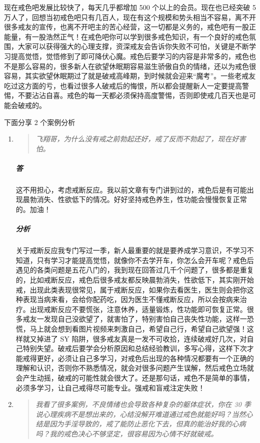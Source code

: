 \documentclass{ctexart}
\begin{document}
现在戒色吧发展比较快了，每天几乎都增加 500 个以上的会员。现在也已经突破 5 万人了，回想当初戒色吧只有几百人，现在有这个规模和势头相当不容易，离不开很多戒友的宣传，也离不开吧主的苦心经营，这一切都是义务的，戒色吧有一股正能量，有一股浩然正气！在戒色吧你可以学到很多戒色知识，有一个良好的戒色氛围，大家可以获得强大的心理支撑，资深戒友会告诉你失败不可怕，关键是不断学习提高觉悟，觉悟修到了即可降伏心魔。戒色后要学习的内容是非常多的，戒色也不是那么容易的，很多新人在欲望休眠期容易滋生骄傲自负的情绪，还以为戒色很容易，其实欲望休眠期过了就是破戒高峰期，到时候就会迎来“魔考”。一些老戒友吃过这方面的亏，也看过很多人破戒后的悔恨，所以都会提醒新人一定要提高警惕，不要沾沾自喜。戒色的每一天都必须保持高度警惕，否则即使戒几百天也是可能会破戒的。

下面分享 2 个案例分析

\begin{enumerate}
    \item \begin{quote}\it
        飞翔哥，为什么没有戒之前勃起还好，戒了反而不勃起了，现在好害怕。
    \end{quote}
    \subparagraph{答} 这不用担心，考虑戒断反应。我以前文章有专门讲到过的，戒色后是有可能出现晨勃消失、性欲低下的情况。好好坚持戒色养生，性功能会慢慢恢复正常的。加油！
    \subparagraph{分析} 关于戒断反应我专门写过一季，新人最重要的就是要养成学习意识，不学习不知道，只有学习才能提高觉悟，就像你不去学开车，你怎么会开车呢？戒色后遇见的各类问题是五花八门的，我到现在回答过几千个问题了，很多都是重复的，比如戒断反应，戒色后很多戒友都反映晨勃消失，性欲低下，其实刚开始戒，出现此类表现很常见，属于戒断反应，如果你去看医生，医生则会把你这种表现当病来看，会给你配药吃，因为医生不懂戒断反应，所以会按病来治疗。出现戒断反应不要慌张，注意休养，适量锻炼，性功能即可恢复正常。很多戒友一发现自己没欲望了，就害怕了，特别害怕自己丧失性功能，这样一恐慌，马上就会想到看图片视频来刺激自己，希望自己行，希望自己欲望强！这样就又掉进了 SY 陷阱，很多戒友真是一发不可收拾，连续破戒好几次，对自己特别失望。破戒后要学会分析原因和总结经验教训，多写心得，这样下次才能戒得更好，必须让自己多学习，对戒色后出现的各种情况都要有一个正确的理解和认识，否则你不熟悉情况，就会对很多问题产生误解，然后戒色立场就会产生动摇，破戒的可能性就会很大了。还是那句话，戒色不是简单的事情，必须多学习，让自己戒得尽可能专业。强戒和盲戒注定失败！
    \item \begin{quote}\it
        我看了很多案例，不良情绪也会导致各种复杂的躯体症状，你在 30 季说心理疾病不是想出来的，心结没解开难道通过戒色就能好吗？当然心结是因为手淫导致的，戒了能防止恶化下去，但真的能治好我的心病吗？我的戒色决心不够坚定，很容易因为心情不好就破戒。

\end{quote}
\end{enumerate}
\end{document}
